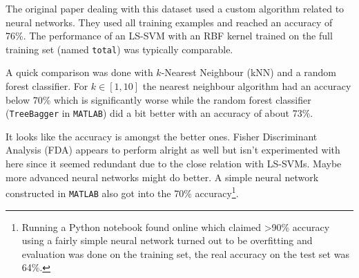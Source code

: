 \par The original paper dealing with this dataset used a custom algorithm related to neural networks. They used all training examples and reached an accuracy of 76\%. The performance of an LS-SVM with an RBF kernel trained on the full training set (named \texttt{total}) was typically comparable. 

\par A quick comparison was done with $k$-Nearest Neighbour (kNN) and a random forest classifier. For $k\in[1,10]$ the nearest neighbour algorithm had an accuracy below 70\% which is significantly worse while the random forest classifier (\texttt{TreeBagger} in \texttt{MATLAB}) did a bit better with an accuracy of about 73\%. 

\par It looks like the accuracy is amongst the better ones. Fisher Discriminant Analysis (FDA) appears to perform alright as well but isn't experimented with here since it seemed redundant due to the close relation with LS-SVMs. Maybe more advanced neural networks might do better. A simple neural network constructed in \texttt{MATLAB} also got into the 70\% accuracy\footnote{Running a Python notebook found online which claimed  >90\% accuracy using a fairly simple neural network turned out to be overfitting and evaluation was done on the training set, the real accuracy on the test set was 64\%.}.


%

